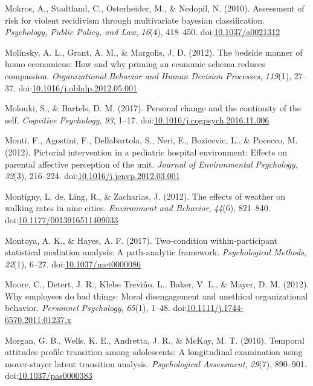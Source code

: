 \documentclass[english,man]{apa6}
\theoremstyle{definition}
\theoremstyle{definition}
\theoremstyle{definition}
\theoremstyle{remark}
\begin{document}
\hypertarget{ref-Mokros2010}{}
Mokros, A., Stadtland, C., Osterheider, M., \& Nedopil, N. (2010).
Assessment of risk for violent recidivism through multivariate bayesian
classification. \emph{Psychology, Public Policy, and Law}, \emph{16}(4),
418--450. doi:\href{https://doi.org/10.1037/a0021312}{10.1037/a0021312}

\hypertarget{ref-Molinsky2012}{}
Molinsky, A. L., Grant, A. M., \& Margolis, J. D. (2012). The bedside
manner of homo economicus: How and why priming an economic schema
reduces compassion. \emph{Organizational Behavior and Human Decision
Processes}, \emph{119}(1), 27--37.
doi:\href{https://doi.org/10.1016/j.obhdp.2012.05.001}{10.1016/j.obhdp.2012.05.001}

\hypertarget{ref-Molouki2017}{}
Molouki, S., \& Bartels, D. M. (2017). Personal change and the
continuity of the self. \emph{Cognitive Psychology}, \emph{93}, 1--17.
doi:\href{https://doi.org/10.1016/j.cogpsych.2016.11.006}{10.1016/j.cogpsych.2016.11.006}

\hypertarget{ref-Monti2012}{}
Monti, F., Agostini, F., Dellabartola, S., Neri, E., Bozicevic, L., \&
Pocecco, M. (2012). Pictorial intervention in a pediatric hospital
environment: Effects on parental affective perception of the unit.
\emph{Journal of Environmental Psychology}, \emph{32}(3), 216--224.
doi:\href{https://doi.org/10.1016/j.jenvp.2012.03.001}{10.1016/j.jenvp.2012.03.001}

\hypertarget{ref-DeMontigny2012}{}
Montigny, L. de, Ling, R., \& Zacharias, J. (2012). The effects of
weather on walking rates in nine cities. \emph{Environment and
Behavior}, \emph{44}(6), 821--840.
doi:\href{https://doi.org/10.1177/0013916511409033}{10.1177/0013916511409033}

\hypertarget{ref-Montoya2017}{}
Montoya, A. K., \& Hayes, A. F. (2017). Two-condition within-participant
statistical mediation analysis: A path-analytic framework.
\emph{Psychological Methods}, \emph{22}(1), 6--27.
doi:\href{https://doi.org/10.1037/met0000086}{10.1037/met0000086}

\hypertarget{ref-Moore2012}{}
Moore, C., Detert, J. R., Klebe Treviño, L., Baker, V. L., \& Mayer, D.
M. (2012). Why employees do bad things: Moral disengagement and
unethical organizational behavior. \emph{Personnel Psychology},
\emph{65}(1), 1--48.
doi:\href{https://doi.org/10.1111/j.1744-6570.2011.01237.x}{10.1111/j.1744-6570.2011.01237.x}

\hypertarget{ref-Morgan2016}{}
Morgan, G. B., Wells, K. E., Andretta, J. R., \& McKay, M. T. (2016).
Temporal attitudes profile transition among adolescents: A longitudinal
examination using mover-stayer latent transition analysis.
\emph{Psychological Assessment}, \emph{29}(7), 890--901.
doi:\href{https://doi.org/10.1037/pas0000383}{10.1037/pas0000383}
\end{document}
